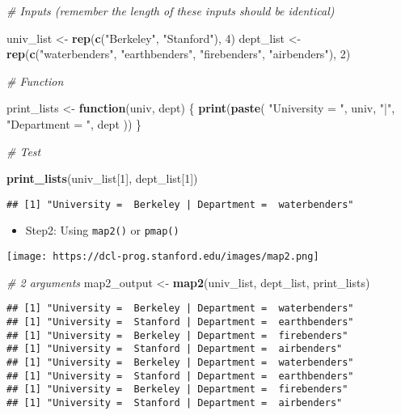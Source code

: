 \documentclass[
]{book}
\newenvironment{Shaded}{\begin{snugshade}}{\end{snugshade}}
\newcommand{\CommentTok}[1]{\textcolor[rgb]{0.56,0.35,0.01}{\textit{#1}}}
\newcommand{\ControlFlowTok}[1]{\textcolor[rgb]{0.13,0.29,0.53}{\textbf{#1}}}
\newcommand{\DecValTok}[1]{\textcolor[rgb]{0.00,0.00,0.81}{#1}}
\newcommand{\KeywordTok}[1]{\textcolor[rgb]{0.13,0.29,0.53}{\textbf{#1}}}
\newcommand{\NormalTok}[1]{#1}
\newcommand{\StringTok}[1]{\textcolor[rgb]{0.31,0.60,0.02}{#1}}
\providecommand{\tightlist}{%
  \setlength{\itemsep}{0pt}\setlength{\parskip}{0pt}}
\begin{document}
\begin{Shaded}
\begin{Highlighting}[]
\CommentTok{\# Inputs (remember the length of these inputs should be identical)}

\NormalTok{univ\_list \textless{}{-}}\StringTok{ }\KeywordTok{rep}\NormalTok{(}\KeywordTok{c}\NormalTok{(}\StringTok{"Berkeley"}\NormalTok{, }\StringTok{"Stanford"}\NormalTok{), }\DecValTok{4}\NormalTok{)}
\NormalTok{dept\_list \textless{}{-}}\StringTok{ }\KeywordTok{rep}\NormalTok{(}\KeywordTok{c}\NormalTok{(}\StringTok{"waterbenders"}\NormalTok{, }\StringTok{"earthbenders"}\NormalTok{, }\StringTok{"firebenders"}\NormalTok{, }\StringTok{"airbenders"}\NormalTok{), }\DecValTok{2}\NormalTok{)}

\CommentTok{\# Function}

\NormalTok{print\_lists \textless{}{-}}\StringTok{ }\ControlFlowTok{function}\NormalTok{(univ, dept) \{}
  \KeywordTok{print}\NormalTok{(}\KeywordTok{paste}\NormalTok{(}
    \StringTok{"University = "}\NormalTok{, univ, }\StringTok{"|"}\NormalTok{,}
    \StringTok{"Department = "}\NormalTok{, dept}
\NormalTok{  ))}
\NormalTok{\}}

\CommentTok{\# Test}

\KeywordTok{print\_lists}\NormalTok{(univ\_list[}\DecValTok{1}\NormalTok{], dept\_list[}\DecValTok{1}\NormalTok{])}
\end{Highlighting}
\end{Shaded}

\begin{verbatim}
## [1] "University =  Berkeley | Department =  waterbenders"
\end{verbatim}

\begin{itemize}
\tightlist
\item
  Step2: Using \texttt{map2()} or \texttt{pmap()}
\end{itemize}

\texttt{[image: https://dcl-prog.stanford.edu/images/map2.png]}

\begin{Shaded}
\begin{Highlighting}[]
\CommentTok{\# 2 arguments}
\NormalTok{map2\_output \textless{}{-}}\StringTok{ }\KeywordTok{map2}\NormalTok{(univ\_list, dept\_list, print\_lists)}
\end{Highlighting}
\end{Shaded}

\begin{verbatim}
## [1] "University =  Berkeley | Department =  waterbenders"
## [1] "University =  Stanford | Department =  earthbenders"
## [1] "University =  Berkeley | Department =  firebenders"
## [1] "University =  Stanford | Department =  airbenders"
## [1] "University =  Berkeley | Department =  waterbenders"
## [1] "University =  Stanford | Department =  earthbenders"
## [1] "University =  Berkeley | Department =  firebenders"
## [1] "University =  Stanford | Department =  airbenders"
\end{verbatim}
\end{document}
